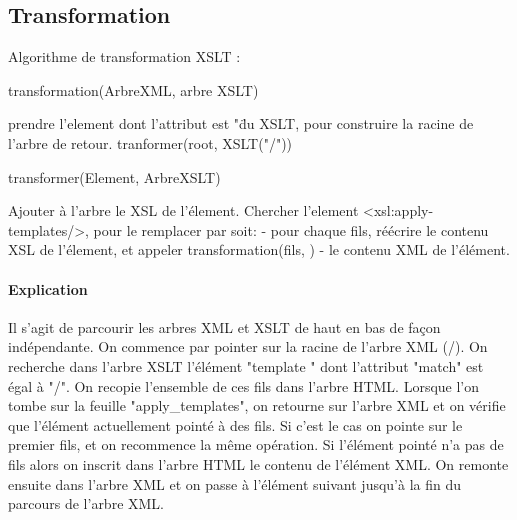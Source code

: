     \subsection{Transformation}
    
     Algorithme de transformation XSLT :
    \begin{algorithm}
	\caption{transformation(ArbreXML, arbre XSLT)}    
    \begin{algorithmic}
		\STATE prendre l'element dont l'attribut est "\" du XSLT, pour construire la racine de l'arbre de retour.
		\STATE tranformer(root, XSLT("/"))
	\end{algorithmic}
    \end{algorithm}
	
	\begin{algorithm}
	\caption{transformer(Element, ArbreXSLT)}    
    \begin{algorithmic}
		\STATE Ajouter à l'arbre le XSL de l'élement.
		\STATE Chercher l'element <xsl:apply-templates/>, pour le remplacer par soit:
			\STATE - pour chaque fils, réécrire le contenu XSL de l'élement, et appeler transformation(fils, ) 
			\STATE - le contenu XML de l'élément.
	\end{algorithmic}
    \end{algorithm}
 
	\paragraph{Explication}
	    Il s'agit de parcourir les arbres XML et XSLT de haut en bas de façon indépendante.
	    On commence par pointer sur la racine de l'arbre XML (/). On recherche dans l'arbre XSLT l'élément "template
" dont l'attribut "match" est égal à "/".
	    On recopie l'ensemble de ces fils dans l'arbre HTML. Lorsque l'on tombe sur la feuille "apply\_templates", 
on retourne sur l'arbre XML et on vérifie que l'élément actuellement pointé à des fils. Si c'est le cas on 
pointe sur le premier fils, et on recommence la même opération. Si l'élément pointé n'a pas de fils alors 
on inscrit dans l'arbre HTML le contenu de l'élément XML. On remonte ensuite dans l'arbre XML et on passe à 
l'élément suivant jusqu'à la fin du parcours de l'arbre XML.


